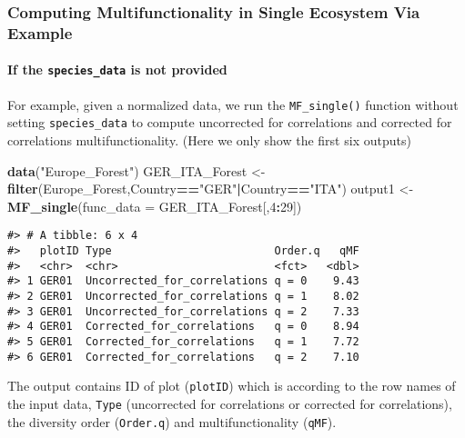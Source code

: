 \documentclass[
]{article}
\newenvironment{Shaded}{\begin{snugshade}}{\end{snugshade}}
\newcommand{\AttributeTok}[1]{\textcolor[rgb]{0.13,0.29,0.53}{#1}}
\newcommand{\DecValTok}[1]{\textcolor[rgb]{0.00,0.00,0.81}{#1}}
\newcommand{\FunctionTok}[1]{\textcolor[rgb]{0.13,0.29,0.53}{\textbf{#1}}}
\newcommand{\NormalTok}[1]{#1}
\newcommand{\OtherTok}[1]{\textcolor[rgb]{0.56,0.35,0.01}{#1}}
\newcommand{\SpecialCharTok}[1]{\textcolor[rgb]{0.81,0.36,0.00}{\textbf{#1}}}
\newcommand{\StringTok}[1]{\textcolor[rgb]{0.31,0.60,0.02}{#1}}
\begin{document}
\hypertarget{computing-multifunctionality-in-single-ecosystem-via-example}{%
\subsubsection{Computing Multifunctionality in Single Ecosystem Via
Example}\label{computing-multifunctionality-in-single-ecosystem-via-example}}

\hypertarget{if-the-species_data-is-not-provided}{%
\paragraph{\texorpdfstring{If the \texttt{species\_data} is not
provided}{If the species\_data is not provided}}\label{if-the-species_data-is-not-provided}}

For example, given a normalized data, we run the \texttt{MF\_single()}
function without setting \texttt{species\_data} to compute uncorrected
for correlations and corrected for correlations multifunctionality.
(Here we only show the first six outputs)

\begin{Shaded}
\begin{Highlighting}[]
\FunctionTok{data}\NormalTok{(}\StringTok{"Europe\_Forest"}\NormalTok{)}
\NormalTok{GER\_ITA\_Forest }\OtherTok{\textless{}{-}} \FunctionTok{filter}\NormalTok{(Europe\_Forest,Country}\SpecialCharTok{==}\StringTok{"GER"}\SpecialCharTok{|}\NormalTok{Country}\SpecialCharTok{==}\StringTok{"ITA"}\NormalTok{)}
\NormalTok{output1 }\OtherTok{\textless{}{-}} \FunctionTok{MF\_single}\NormalTok{(}\AttributeTok{func\_data =}\NormalTok{ GER\_ITA\_Forest[,}\DecValTok{4}\SpecialCharTok{:}\DecValTok{29}\NormalTok{])}
\end{Highlighting}
\end{Shaded}

\begin{verbatim}
#> # A tibble: 6 x 4
#>   plotID Type                         Order.q   qMF
#>   <chr>  <chr>                        <fct>   <dbl>
#> 1 GER01  Uncorrected_for_correlations q = 0    9.43
#> 2 GER01  Uncorrected_for_correlations q = 1    8.02
#> 3 GER01  Uncorrected_for_correlations q = 2    7.33
#> 4 GER01  Corrected_for_correlations   q = 0    8.94
#> 5 GER01  Corrected_for_correlations   q = 1    7.72
#> 6 GER01  Corrected_for_correlations   q = 2    7.10
\end{verbatim}

The output contains ID of plot (\texttt{plotID}) which is according to
the row names of the input data, \texttt{Type} (uncorrected for
correlations or corrected for correlations), the diversity order
(\texttt{Order.q}) and multifunctionality (\texttt{qMF}).
\end{document}
